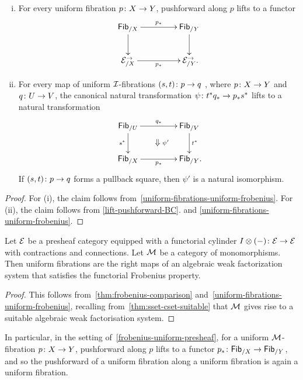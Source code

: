 \documentclass[reqno,10pt,a4paper,oneside,draft]{amsart}
\begin{document}
{{\begin{corollary} \label{uniform-fibrations-frobenius-pushforward} \label{uniform-fibrations-BC-pushforward}
\hfill
\begin{enumerate}[(i)] 
\item For every uniform fibration
$p \co X \to Y$, pushforward along $p$ lifts to a functor
\[
\xymatrix@C+2em{
  \Fib_{/X}
  \ar[r]^{p_*}
  \ar[d]
&
  \Fib_{/Y}
  \ar[d]
\\
  \catE_{/X}^\to
  \ar[r]_{p_*}
&
  \catE_{/Y}^\to
\rlap{.}}
\]
\item For every map of uniform $\cal{I}$-fibrations $(s, t) \co p \to q$ , where $p \co X \to Y$ and $q \co U \to V$, the canonical natural transformation $\psi \co t^* q_* \to p_* s^*$ lifts to a natural transformation
\[
\xymatrix@C+2em{
  \Fib_{/U}
  \ar[r]^{q_*}
  \ar[d]_{s^*}
  \ar@{}[dr]|{\textstyle\Downarrow \rlap{$\labelstyle \psi'$}}
&
  \Fib_{/V}
  \ar[d]^{t^*}
\\
  \Fib_{/X}
  \ar[r]_{p_*}
&
  \Fib_{/Y}
\rlap{.}}
\]
If $(s, t) \co p \to q$ forms a pullback square, then $\psi'$ is a natural isomorphism.
\end{enumerate}
\end{corollary}


\begin{proof}
For (i), the claim follows from~\cref{uniform-fibrations-uniform-frobenius}. For (ii), the claim follows from \cref{lift-pushforward-BC}.
and \cref{uniform-fibrations-uniform-frobenius}.
\end{proof}




\begin{theorem} \label{frobenius-uniform-presheaf}
Let $\catE$ be a presheaf category equipped with a functorial cylinder $I \otimes (-) \co \catE \to \catE$ with 
contractions and connections. Let $\cal{M}$ be a category of monomorphisms.
Then uniform fibrations are the right maps of an algebraic weak factorization system that satisfies the functorial Frobenius property.
\end{theorem}

\begin{proof}
This follows from~\cref{thm:frobenius-comparison} and~\cref{uniform-fibrations-uniform-frobenius}, recalling
from~\cref{thm:sset-cset-suitable} that $\cal{M}$ gives rise to a suitable algebraic weak factorisation
system.
\end{proof}

In particular, in the setting of~\cref{frobenius-uniform-presheaf}, for a uniform $\cal{M}$-fibration $p \co X \to Y$, pushforward along $p$ lifts to a functor $p_* \co \Fib_{/X} \to \Fib_{/Y}$, 
and so the pushforward of a uniform fibration along a uniform fibration is again a uniform fibration.

}}
\end{document}
